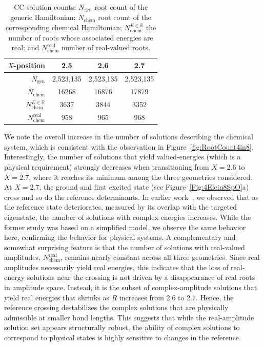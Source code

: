 \documentclass[11pt,reqno]{amsart}
\theoremstyle{definition}
\numberwithin{theorem}{section}
\numberwithin{equation}{section}
\begin{document}
\begin{table}[htbp]
    \centering
    \begin{tabular}{r|ccc}
    \toprule
        $X$-position   &  2.5 & 2.6 & 2.7 \\
        \midrule
        $N_{\mathrm{gen}}$  &  2,523,135 & 2,523,135 & 2,523,135\\
        \midrule
        $N_{\mathrm{chem}}$ & 16268 &16876 & 17879\\
        $N_{\mathrm{chem}}^{E\in\mathbb{R}}$ & 3637 & 3844 & 3352\\
        $N_{\mathrm{chem}}^{\mathrm{real}}$ & 958 & 965 & 968\\
        \bottomrule
    \end{tabular}
    \caption{CC solution counts: $N_{\mathrm{gen}}$  root count of the generic Hamiltonian; $N_{\mathrm{chem}}$ root count of the corresponding chemical Hamiltonian; $N_{\mathrm{chem}}^{E\in\mathbb{R}}$ the number of roots whose associated energies are real; and $N_{\mathrm{chem}}^{\mathrm{real}}$ number of real-valued roots.}
    \label{tab:SolutionCount4in10}
\end{table}

We note the overall increase in the number of solutions describing the chemical system, which is consistent with the observation in Figure~\ref{fig:RootCount4in8}. Interestingly, the number of solutions that yield valued-energies (which is a physical requirement) strongly decreases when transitioning from $X = 2.6$ to $X=2.7$, where it reaches its minimum among the three geometries considered. At $X=2.7$, the ground and first excited state (see Figure~\ref{Fig:4Elein8SpO}a) cross and so do the reference determinants. In earlier work~\cite{faulstich2024coupled}, we observed that as the reference state deteriorates, measured by its overlap with the targeted eigenstate, the number of solutions with complex energies increases. While the former study was based on a simplified model, we observe the same behavior here, confirming the behavior for physical systems. A complementary and somewhat surprising feature is that the number of solutions with real-valued amplitudes, $N_{\mathrm{chem}}^{\mathrm{real}}$, remains nearly constant across all three geometries. Since real amplitudes necessarily yield real energies, this indicates that the loss of real-energy solutions near the crossing is not driven by a disappearance of real roots in amplitude space. Instead, it is the subset of complex-amplitude solutions that yield real energies that shrinks as $R$ increases from 2.6 to 2.7. Hence, the reference crossing destabilizes the complex solutions that are physically admissible at smaller bond lengths. This suggests that while the real-amplitude solution set appears structurally robust, the ability of complex solutions to correspond to physical states is highly sensitive to changes in the reference.
\end{document}
